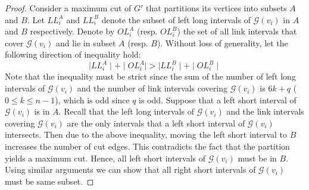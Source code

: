 \documentclass[11pt]{article}
\begin{document}
\begin{proof}
Consider a maximum cut of $G'$ that partitions its vertices into subsets $A$ and $B$. Let $LL^A_i$ and $LL^B_i$ denote the subset of left long intervals of $\mathcal{G}(v_i)$ in $A$ and $B$ respectively. Denote by $OL^A_i$ (resp. $OL^B_i$) the set of all link intervals that cover $\mathcal{G}(v_i)$ and lie in subset $A$ (resp. $B$). Without loss of generality, let the following direction of inequality hold: 
 $$\mid LL^A_i \mid + \mid OL^A_i \mid > \mid LL^B_i \mid + \mid OL^B_i \mid$$
 Note that the inequality must be strict since the sum of the number of left long intervals of $\mathcal{G}(v_i)$ and the number of  link intervals covering $\mathcal{G}(v_i)$ is $6k + q$ ($0 \leq k \leq n-1$), which is odd since $q$ is odd. Suppose that a left short interval of $\mathcal{G}(v_i)$ is in $A$. Recall that the left long intervals of $\mathcal{G}(v_i)$ and the link intervals covering $\mathcal{G}(v_i)$ are the only intervals that a left short interval of $\mathcal{G}(v_i)$ intersects. Then due to the above inequality, moving the left short interval to $B$ increases the number of cut edges. This contradicts the fact that the partition yields a maximum cut. Hence, all left short intervals of $\mathcal{G}(v_i)$ must be in $B$. Using similar arguments we can show that all right short intervals of $\mathcal{G}(v_i)$ must be same subset.
\end{proof}



\end{document}
